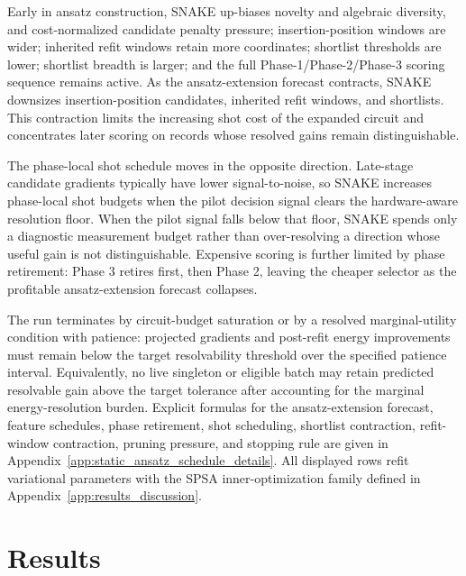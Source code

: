 \documentclass[
  reprint,
  amsmath,
  amssymb,
  aps,
  pra,
  nofootinbib,
  superscriptaddress,
  floatfix
]{revtex4-2}
\begin{document}
Early in ansatz construction, SNAKE up-biases novelty and algebraic diversity, and cost-normalized candidate penalty pressure; insertion-position windows are wider; inherited refit windows retain more coordinates; shortlist thresholds are lower; shortlist breadth is larger; and the full Phase-1/Phase-2/Phase-3 scoring sequence remains active. As the ansatz-extension forecast contracts, SNAKE downsizes insertion-position candidates, inherited refit windows, and shortlists. This contraction limits the increasing shot cost of the expanded circuit and concentrates later scoring on records whose resolved gains remain distinguishable.

The phase-local shot schedule moves in the opposite direction. Late-stage candidate gradients typically have lower signal-to-noise, so SNAKE increases phase-local shot budgets when the pilot decision signal clears the hardware-aware resolution floor. When the pilot signal falls below that floor, SNAKE spends only a diagnostic measurement budget rather than over-resolving a direction whose useful gain is not distinguishable. Expensive scoring is further limited by phase retirement: Phase 3 retires first, then Phase 2, leaving the cheaper selector as the profitable ansatz-extension forecast collapses.

The run terminates by circuit-budget saturation or by a resolved marginal-utility condition with patience: projected gradients and post-refit energy improvements must remain below the target resolvability threshold over the specified patience interval. Equivalently, no live singleton or eligible batch may retain predicted resolvable gain above the target tolerance after accounting for the marginal energy-resolution burden. Explicit formulas for the ansatz-extension forecast, feature schedules, phase retirement, shot scheduling, shortlist contraction, refit-window contraction, pruning pressure, and stopping rule are given in Appendix~\ref{app:static_ansatz_schedule_details}. All displayed rows refit variational parameters with the SPSA inner-optimization family defined in Appendix~\ref{app:results_discussion}.

\section{Results}
\label{sec:results}
\label{sec:benchmarks}
\end{document}

